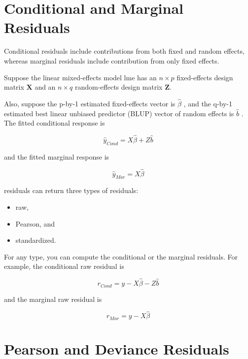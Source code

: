 \documentclass[12pt, a4paper]{report}
\theoremstyle{plain}
\theoremstyle{definition}
\theoremstyle{remark}
\begin{document}
	
	\section{Conditional and Marginal Residuals}
	Conditional residuals include contributions from both fixed and random effects, whereas marginal residuals include contribution from only fixed effects.
	
	Suppose the linear mixed-effects model lme has an $n \times p$ fixed-effects design matrix $\boldsymbol{X}$ and an $n \times q$ random-effects design matrix $\boldsymbol{Z}$. 
	
	Also, suppose the p-by-1 estimated fixed-effects vector is $\hat{\beta}$ , and the q-by-1 estimated best linear unbiased predictor (BLUP) 
	vector of random effects is $\hat{b}$ . The fitted conditional response is
	
	\[ \hat{y}_{Cond} = X \hat{\beta} + Z \hat{b} \]
	
	and the fitted marginal response is
	
	
	\[ \hat{y}_{Mar} = X \hat{\beta} \]
	
	residuals can return three types of residuals:
	\begin{itemize} 
		\item raw, 
		\item Pearson, and 
		\item standardized.\end{itemize} 
	
	For any type, you can compute the conditional or the marginal residuals. For example, the conditional raw residual is
	
	
	\[ r_{Cond} = y - X \hat{\beta} - Z \hat{b} \]
	
	and the marginal raw residual is
	
	
	
	\[ r_{Mar} = y - X \hat{\beta} \]
	



	
	
	
	\section{Pearson and Deviance Residuals} 
	
\end{document}
